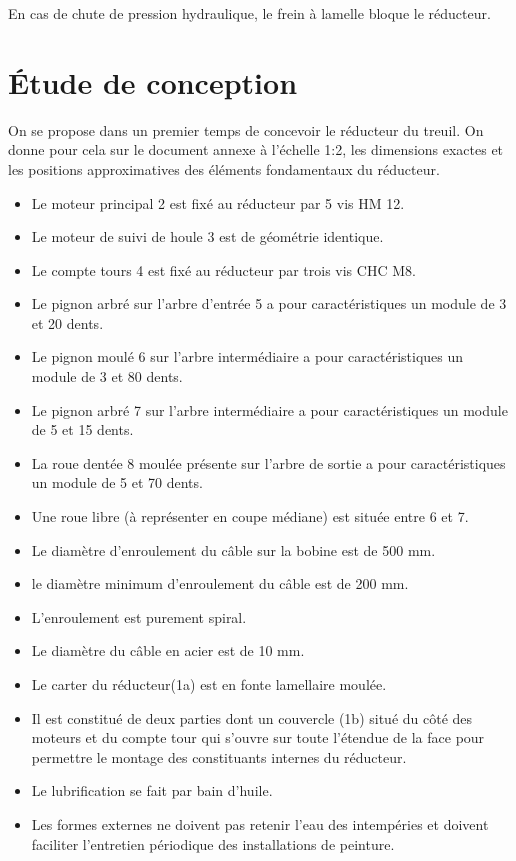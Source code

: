 \documentclass[10pt]{article}
\begin{document}
En cas de chute de pression hydraulique, le frein à lamelle bloque le réducteur. 

\section{Étude de conception}

On se propose dans un premier temps de concevoir le réducteur du treuil. On donne pour cela sur le document annexe à l'échelle 1:2, les dimensions exactes et les positions approximatives des éléments fondamentaux du réducteur. 

\begin{itemize}
\item Le moteur principal 2 est fixé au réducteur par 5 vis HM 12.
\item Le moteur de suivi de houle 3 est de géométrie identique.
\item Le compte tours 4 est fixé au réducteur par trois vis CHC M8.
\item Le pignon arbré sur l'arbre d'entrée 5 a pour caractéristiques un module de 3 et 20 dents.
\item Le pignon moulé 6 sur l'arbre intermédiaire a pour caractéristiques un module de 3 et 80 dents.
\item Le pignon arbré 7 sur l'arbre intermédiaire a pour caractéristiques un module de 5 et 15 dents.
\item La roue dentée 8 moulée présente sur l'arbre de sortie a pour caractéristiques un module de 5 et 70 dents.
\item Une roue libre (à représenter en coupe médiane) est située entre 6 et 7.
\item Le diamètre d'enroulement du câble sur la bobine est de 500\; mm.
\item le diamètre minimum d'enroulement du câble est de 200 \; mm.
\item L'enroulement est purement spiral.
\item Le diamètre du câble en acier est de 10 mm.
\item Le carter du réducteur(1a) est en fonte lamellaire moulée. 
\item Il est constitué de deux parties dont un couvercle (1b) situé du côté des moteurs et du compte tour qui s'ouvre sur toute l'étendue de la face pour permettre le montage des constituants internes du réducteur.
\item Le lubrification se fait par bain d'huile.
\item Les formes externes ne doivent pas retenir l'eau des intempéries et doivent faciliter l'entretien périodique des installations de peinture. 
\end{itemize}
\end{document}
